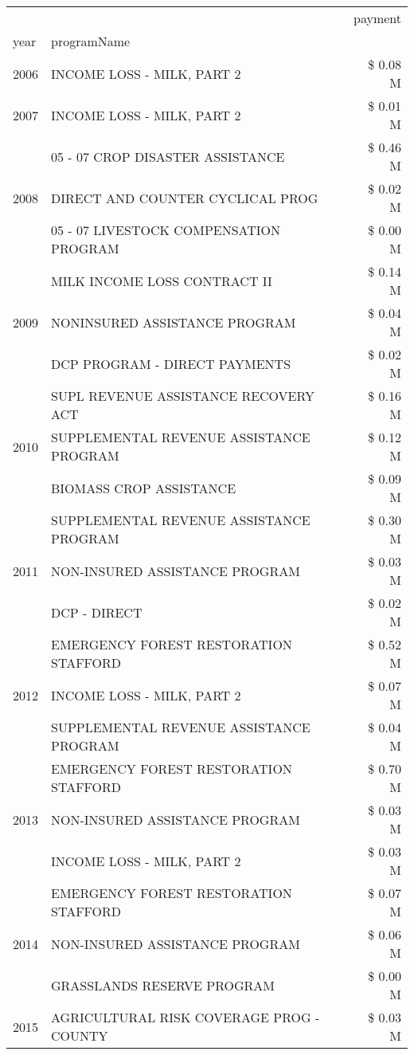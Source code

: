 \begin{tabular}{llr}
\toprule
 &  & payment \\
year & programName &  \\
\midrule
2006 & INCOME LOSS - MILK, PART 2 & \$ 0.08 M \\
\cline{1-3}
2007 & INCOME LOSS - MILK, PART 2 & \$ 0.01 M \\
\cline{1-3}
\multirow[t]{3}{*}{2008} & 05 - 07 CROP DISASTER ASSISTANCE & \$ 0.46 M \\
 & DIRECT AND COUNTER CYCLICAL PROG & \$ 0.02 M \\
 & 05 - 07 LIVESTOCK COMPENSATION PROGRAM & \$ 0.00 M \\
\cline{1-3}
\multirow[t]{3}{*}{2009} & MILK INCOME LOSS CONTRACT II & \$ 0.14 M \\
 & NONINSURED ASSISTANCE PROGRAM & \$ 0.04 M \\
 & DCP PROGRAM - DIRECT PAYMENTS & \$ 0.02 M \\
\cline{1-3}
\multirow[t]{3}{*}{2010} & SUPL REVENUE ASSISTANCE RECOVERY ACT & \$ 0.16 M \\
 & SUPPLEMENTAL REVENUE ASSISTANCE PROGRAM & \$ 0.12 M \\
 & BIOMASS CROP ASSISTANCE & \$ 0.09 M \\
\cline{1-3}
\multirow[t]{3}{*}{2011} & SUPPLEMENTAL REVENUE ASSISTANCE PROGRAM & \$ 0.30 M \\
 & NON-INSURED ASSISTANCE PROGRAM & \$ 0.03 M \\
 & DCP - DIRECT & \$ 0.02 M \\
\cline{1-3}
\multirow[t]{3}{*}{2012} & EMERGENCY FOREST RESTORATION STAFFORD & \$ 0.52 M \\
 & INCOME LOSS - MILK, PART 2 & \$ 0.07 M \\
 & SUPPLEMENTAL REVENUE ASSISTANCE PROGRAM & \$ 0.04 M \\
\cline{1-3}
\multirow[t]{3}{*}{2013} & EMERGENCY FOREST RESTORATION STAFFORD & \$ 0.70 M \\
 & NON-INSURED ASSISTANCE PROGRAM & \$ 0.03 M \\
 & INCOME LOSS - MILK, PART 2 & \$ 0.03 M \\
\cline{1-3}
\multirow[t]{3}{*}{2014} & EMERGENCY FOREST RESTORATION STAFFORD & \$ 0.07 M \\
 & NON-INSURED ASSISTANCE PROGRAM & \$ 0.06 M \\
 & GRASSLANDS RESERVE PROGRAM & \$ 0.00 M \\
\cline{1-3}
\multirow[t]{3}{*}{2015} & AGRICULTURAL RISK COVERAGE PROG - COUNTY & \$ 0.03 M \\

\end{tabular}
